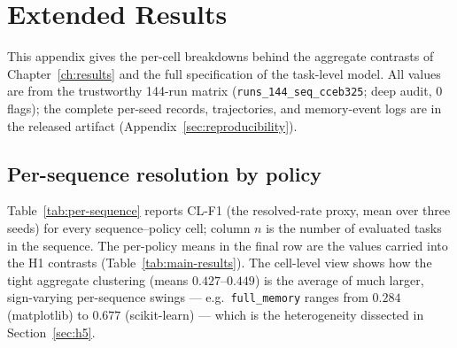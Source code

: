 

\section{Extended Results}

This appendix gives the per-cell breakdowns behind the aggregate contrasts of
Chapter~\ref{ch:results} and the full specification of the task-level model. All values are
from the trustworthy 144-run matrix (\texttt{runs\_144\_seq\_cceb325}; deep audit, 0 flags);
the complete per-seed records, trajectories, and memory-event logs are in the released
artifact (Appendix~\ref{sec:reproducibility}).

\subsection{Per-sequence resolution by policy}

Table~\ref{tab:per-sequence} reports CL-F1 (the resolved-rate proxy, mean over three seeds)
for every sequence--policy cell; column $n$ is the number of evaluated tasks in the sequence.
The per-policy means in the final
row are the values carried into the H1 contrasts (Table~\ref{tab:main-results}). The cell-level
view shows how the tight aggregate clustering (means $0.427$--$0.449$) is the average of much
larger, sign-varying per-sequence swings --- e.g.\ \texttt{full\_memory} ranges from $0.284$
(matplotlib) to $0.677$ (scikit-learn) --- which is the heterogeneity dissected in
Section~\ref{sec:h5}.

